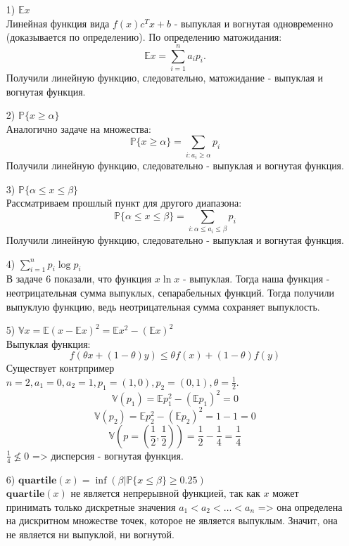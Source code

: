 \documentclass[12pt,letterpaper]{article}
\begin{document}
\begin{itemize}
	\item[1) ] $\mathbb{E}x$\\
Линейная функция вида $ f(x) c^T x + b $ - выпуклая и вогнутая одновременно (доказывается по определению). По определению матожидания: $$\mathbb{E}x = \sum\limits_{i=1}^n a_i p_i.$$ 
Получили линейную функцию, следовательно, матожидание - выпуклая и вогнутая функция.

	\item[2) ] $\mathbb{P}\{x \geqslant \alpha\}$ \\
Аналогично задаче на множества:
$$\mathbb{P}\{x \geqslant \alpha\} = \sum\limits_{i: a_i \geq \alpha} p_i$$
Получили линейную функцию, следовательно - выпуклая и вогнутая функция.

	\item[3) ] $\mathbb{P}\{\alpha \le x \le \beta\}$\\
Рассматриваем прошлый пункт для другого диапазона:
$$ \mathbb{P}\{\alpha \le x \le \beta\} = \sum\limits_{i: \alpha \le a_i \le \beta} p_i$$
Получили линейную функцию, следовательно - выпуклая и вогнутая функция.

	\item[4) ] $\sum\limits_{i=1}^n p_i \log p_i$\\
В задаче 6 показали, что функция $ x \ln x $ - выпуклая. Тогда наша функция - неотрицательная сумма выпуклых, сепарабельных функций. Тогда получили выпуклую функцию, ведь неотрицательная сумма сохраняет выпуклость.

	\item[5) ] $\mathbb{V}x = \mathbb{E}(x - \mathbb{E}x)^2 = \mathbb{E} x^2 - \left( \mathbb{E} x \right)^2 $\\
Выпуклая функция:
$$f(\theta x+(1-\theta) y) \leq \theta f(x)+(1-\theta) f(y)$$
Существует контрпример $ n = 2, a_1 = 0, a_2 = 1, p_1 = (1, 0), p_2 = (0, 1), \theta = \frac{1}{2} $.
$$ \mathbb{V}(p_1) = \mathbb{E} p_1^2 - \left( \mathbb{E} p_1 \right)^2 = 0$$
$$ \mathbb{V}(p_2) = \mathbb{E} p_2^2 - \left( \mathbb{E} p_2 \right)^2 = 1 - 1 = 0$$
$$ \mathbb{V}(p = (\frac{1}{2}, \frac{1}{2})) = \frac{1}{2} - \frac{1}{4} = \frac{1}{4} $$
$ \frac{1}{4} \nleq 0 $ => дисперсия - вогнутая функция.

	\item[6) ] $\mathbf{quartile}(x) = {\operatorname{inf}}\left( \beta | \mathbb{P}\{x \leqslant \beta\}  \geqslant 0.25 \right)$\\
$\mathbf{quartile}(x)$ не является непрерывной функцией, так как $ x $ может принимать только дискретные значения $ a_1 < a_2 < \ldots < a_n $ => она определена на дискритном множестве точек, которое не является выпуклым. Значит, она не является ни выпуклой, ни вогнутой. 
\end{itemize}
\end{document}
